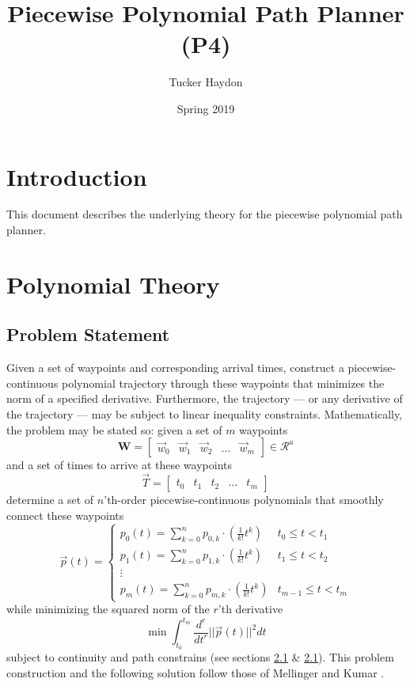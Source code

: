 \documentclass[12pt]{article}
\title{Piecewise Polynomial Path Planner (P4)}
\author{Tucker Haydon}
\date{Spring 2019}
\begin{document}
\maketitle

\section{Introduction}
This document describes the underlying theory for the piecewise polynomial path
planner.

\section{Polynomial Theory}
\subsection{Problem Statement}
Given a set of waypoints and corresponding arrival times, construct a
piecewise-continuous polynomial trajectory through these waypoints that minimizes
the norm of a specified derivative. Furthermore, the trajectory --- or any
derivative of the trajectory --- may be subject to linear inequality
constraints.
\bigbreak
\noindent Mathematically, the problem may be stated so: given a set of $m$ waypoints 
%
\begin{equation}
  \mathbf{W} = 
  \begin{bmatrix}
    \vec{w}_{0} & \vec{w}_{1} & \vec{w}_{2} & \hdots & \vec{w}_{m}
  \end{bmatrix}
  \in \mathcal{R}^a
\end{equation}
%
and a set of times to arrive at these waypoints 
\begin{equation}
  \vec{T} = 
  \begin{bmatrix}
    t_{0} & t_{1} & t_{2} & \hdots & t_{m}
  \end{bmatrix}
\end{equation}
%
determine a set of $n$'th-order piecewise-continuous polynomials that smoothly connect these waypoints
%
\begin{equation}
  \vec{p}(t) = 
  \begin{cases}
    p_{0}(t) = \sum_{k=0}^{n} p_{0,k} \cdot (\frac{1}{k!} t^{k}) & t_{0} \leq t < t_{1} \\ 
    p_{1}(t) = \sum_{k=0}^{n} p_{1,k} \cdot (\frac{1}{k!} t^{k}) & t_{1} \leq t < t_{2} \\ 
    \vdots \\
    p_{m}(t) = \sum_{k=0}^{n} p_{m,k} \cdot (\frac{1}{k!} t^{k}) & t_{m-1} \leq t < t_{m}
  \end{cases}
\end{equation}
%
while minimizing the squared norm of the $r$'th derivative
%
\begin{equation}
  \min
  \int_{t_{0}}^{t_{m}} \frac{d^{r}}{dt^{r}}|| \vec{p}(t) ||^{2} dt
\end{equation}
%
subject to continuity and path constrains (see sections \ref{} \& \ref{}).
\bigbreak
\noindent This problem construction and the following solution follow those of Mellinger
and Kumar \cite{mellinger2011minimum}.
\end{document}
